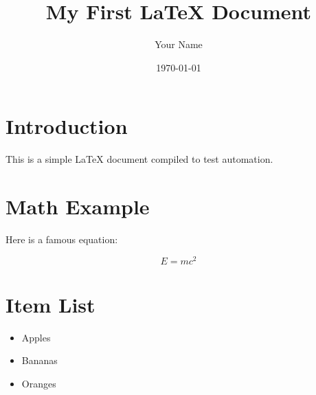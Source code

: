 \documentclass{article}
\title{My First LaTeX Document}
\author{Your Name}
\date{\today}
\begin{document}
\maketitle

\section{Introduction}
This is a simple LaTeX document compiled to test automation.

\section{Math Example}
Here is a famous equation:

\[
E = mc^2
\]

\section{Item List}
\begin{itemize}
    \item Apples
    \item Bananas
    \item Oranges
\end{itemize}
\end{document}
